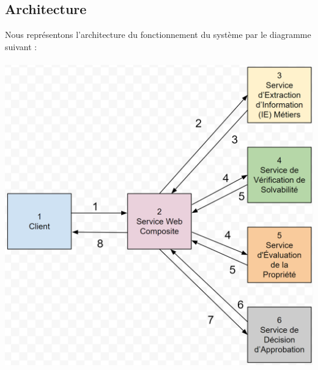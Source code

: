 \documentclass{article}
\begin{document}
	\subsection{Architecture}
	Nous représentons l’architecture du fonctionnement du système par le diagramme suivant : 
	\\
	\\
		\includegraphics[width=\textwidth]{images/architecture.png}
\end{document}
